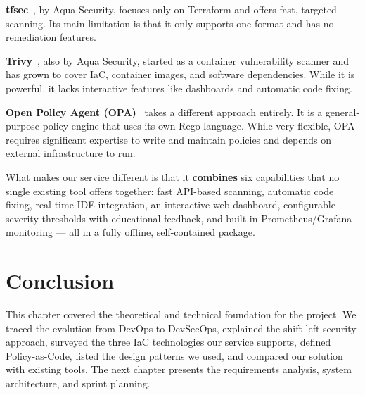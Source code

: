 \textbf{tfsec}~\cite{aquasecurity2024tfsec}, by Aqua Security, focuses only on Terraform and offers fast, targeted scanning. Its main limitation is that it only supports one format and has no remediation features.

\textbf{Trivy}~\cite{aquasecurity2024trivy}, also by Aqua Security, started as a container vulnerability scanner and has grown to cover IaC, container images, and software dependencies. While it is powerful, it lacks interactive features like dashboards and automatic code fixing.

\textbf{Open Policy Agent (OPA)}~\cite{openpolicyagent2024} takes a different approach entirely. It is a general-purpose policy engine that uses its own Rego language. While very flexible, OPA requires significant expertise to write and maintain policies and depends on external infrastructure to run.

\vspace{0.3cm}
\noindent What makes our service different is that it \textbf{combines} six capabilities that no single existing tool offers together: fast API-based scanning, automatic code fixing, real-time IDE integration, an interactive web dashboard, configurable severity thresholds with educational feedback, and built-in Prometheus/Grafana monitoring --- all in a fully offline, self-contained package.


\section{Conclusion}

This chapter covered the theoretical and technical foundation for the project. We traced the evolution from DevOps to DevSecOps, explained the shift-left security approach, surveyed the three IaC technologies our service supports, defined Policy-as-Code, listed the design patterns we used, and compared our solution with existing tools. The next chapter presents the requirements analysis, system architecture, and sprint planning.
